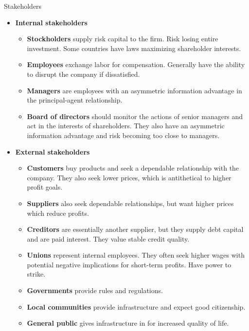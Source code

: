\documentclass[../custom]{flashcards}
\newcommand{\studyArea}{Equity Portfolio Management}
\begin{document}
\begin{flashcard}[\studyArea]{Stakeholders}
    \begin{itemize}[noitemsep]
        \item \textbf{Internal stakeholders}
            \begin{itemize}[noitemsep]
                \item \textbf{Stockholders} supply risk capital to the firm. Risk losing entire investment. Some countries have laws maximizing shareholder interests.
                \item \textbf{Employees} exchange labor for compensation. Generally have the ability to disrupt the company if dissatisfied.
                \item \textbf{Managers} are employees with an asymmetric information advantage in the principal-agent relationship.
                \item \textbf{Board of directors} should monitor the actions of senior managers and act in the interests of shareholders. They also have an asymmetric information advantage and risk becoming too close to managers.
            \end{itemize}
        \item \textbf{External stakeholders}
            \begin{itemize}[noitemsep]
                \item \textbf{Customers} buy products and seek a dependable relationship with the company. They also seek lower prices, which is antithetical to higher profit goals.
                \item \textbf{Suppliers} also seek dependable relationships, but want higher prices which reduce profits.
                \item \textbf{Creditors} are essentially another supplier, but they supply debt capital and are paid interest. They value stable credit quality.
                \item \textbf{Unions} represent internal employees. They often seek higher wages with potential negative implications for short-term profits. Have power to strike.
                \item \textbf{Governments} provide rules and regulations.
                \item \textbf{Local communities} provide infrastructure and expect good citizenship.
                \item \textbf{General public} gives infrastructure in for increased quality of life.
            \end{itemize}
    \end{itemize}
\end{flashcard}
\end{document}
